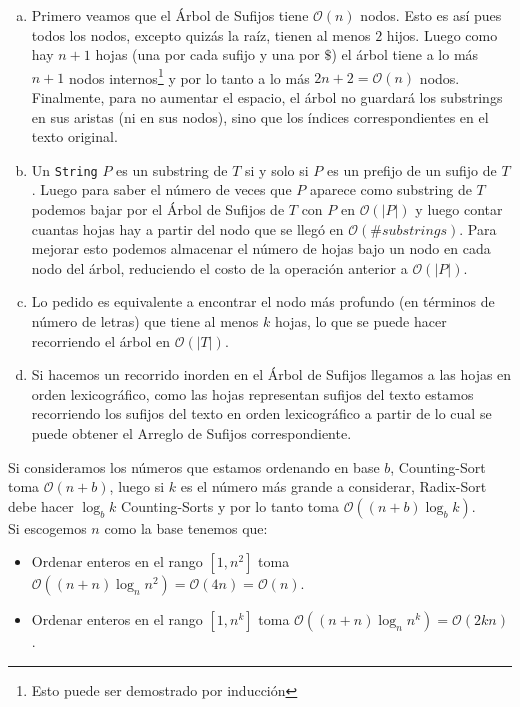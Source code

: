 \documentclass[dcc,uchile]{fcfmcourse}
\begin{document}
\begin{problems}
\begin{enumerate}[a)]
\end{enumerate}
\item 
\begin{enumerate}[a)]
\item Primero veamos que el Árbol de Sufijos tiene $\mathcal{O}(n)$ nodos. Esto es así pues todos los nodos, excepto quizás la raíz, tienen al menos $2$ hijos. Luego como hay $n+1$ hojas (una por cada sufijo y una por $\$$) el árbol tiene a lo más $n+1$ nodos internos\footnote{Esto puede ser demostrado por inducción} y por lo tanto a lo más $2n + 2 = \mathcal{O}(n)$ nodos. Finalmente, para no aumentar el espacio, el árbol no guardará los substrings en sus aristas (ni en sus nodos), sino que los índices correspondientes en el texto original.
\item Un \texttt{String} $P$ es un substring de $T$ si y solo si $P$ es un prefijo de un sufijo de $T$. Luego para saber el número de veces que $P$ aparece como substring de $T$ podemos bajar por el Árbol de Sufijos de $T$ con $P$ en $\mathcal{O}(|P|)$ y luego contar cuantas hojas hay a partir del nodo que se llegó en $\mathcal{O}(\# substrings)$. Para mejorar esto podemos almacenar el número de hojas bajo un nodo en cada nodo del árbol, reduciendo el costo de la operación anterior a $\mathcal{O}(|P|)$.
\item  Lo pedido es equivalente a encontrar el nodo más profundo (en términos de número de letras) que tiene al menos $k$ hojas, lo que se puede hacer recorriendo el árbol en $\mathcal{O}(|T|)$.\perfect
\item Si hacemos un recorrido inorden en el Árbol de Sufijos llegamos a las hojas en orden lexicográfico, como las hojas representan sufijos del texto estamos recorriendo los sufijos del texto en orden lexicográfico a partir de lo cual se puede obtener el Arreglo de Sufijos correspondiente.
\end{enumerate}
\item Si consideramos los números que estamos ordenando en base $b$, Counting-Sort toma $\mathcal{O}(n+b)$, luego si $k$ es el número más grande a considerar, Radix-Sort debe hacer $\log_{b} k$ Counting-Sorts y por lo tanto toma $\mathcal{O}((n+b)\log_{b} k)$.\\

Si escogemos $n$ como la base tenemos que:
\begin{itemize}
    \item Ordenar enteros en el rango $[1, n^2]$ toma $\mathcal{O}((n+n)\log_{n} n^2) = \mathcal{O}(4n) = \mathcal{O}(n)$.
    \item Ordenar enteros en el rango $[1, n^k]$ toma $\mathcal{O}((n+n)\log_{n} n^k) = \mathcal{O}(2kn)$.
\end{itemize}
\end{problems}
\end{document}
